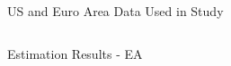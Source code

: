 \documentclass[final]{beamer}
\begin{document}
\begin{frame}
\begin{columns}[t]
\begin{column}{.53 \linewidth}
\begin{block}{US and Euro Area Data Used in Study}
\begin{itemize}
\end{itemize}

\end{block}%

\vspace{.4 cm}%

\begin{columns}[c]%

\begin{column}{.48 \linewidth}%

\begin{block}{Estimation Results - EA}%


\end{block}
\end{column}
\end{columns}
\end{column}
\end{columns}
\end{frame}
\end{document}

